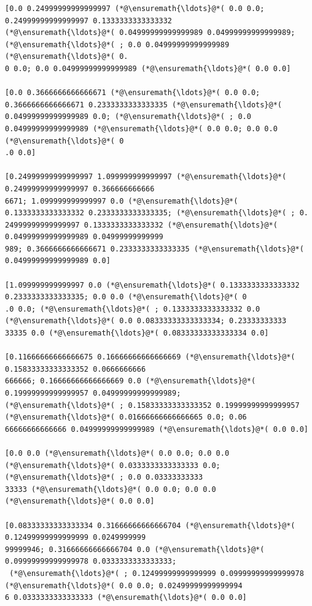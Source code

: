 \documentclass[12pt,a4paper]{article}
\begin{document}
\begin{lstlisting}
[0.0 0.24999999999999997 (*@\ensuremath{\ldots}@*( 0.0 0.0; 0.24999999999999997 0.1333333333333332 
(*@\ensuremath{\ldots}@*( 0.04999999999999989 0.04999999999999989; (*@\ensuremath{\ldots}@*( ; 0.0 0.04999999999999989 (*@\ensuremath{\ldots}@*( 0.
0 0.0; 0.0 0.04999999999999989 (*@\ensuremath{\ldots}@*( 0.0 0.0]

[0.0 0.3666666666666671 (*@\ensuremath{\ldots}@*( 0.0 0.0; 0.3666666666666671 0.2333333333333335 (*@\ensuremath{\ldots}@*( 
0.04999999999999989 0.0; (*@\ensuremath{\ldots}@*( ; 0.0 0.04999999999999989 (*@\ensuremath{\ldots}@*( 0.0 0.0; 0.0 0.0 (*@\ensuremath{\ldots}@*( 0
.0 0.0]

[0.24999999999999997 1.099999999999997 (*@\ensuremath{\ldots}@*( 0.24999999999999997 0.366666666666
6671; 1.099999999999997 0.0 (*@\ensuremath{\ldots}@*( 0.1333333333333332 0.2333333333333335; (*@\ensuremath{\ldots}@*( ; 0.
24999999999999997 0.1333333333333332 (*@\ensuremath{\ldots}@*( 0.04999999999999989 0.04999999999999
989; 0.3666666666666671 0.2333333333333335 (*@\ensuremath{\ldots}@*( 0.04999999999999989 0.0]

[1.099999999999997 0.0 (*@\ensuremath{\ldots}@*( 0.1333333333333332 0.2333333333333335; 0.0 0.0 (*@\ensuremath{\ldots}@*( 0
.0 0.0; (*@\ensuremath{\ldots}@*( ; 0.1333333333333332 0.0 (*@\ensuremath{\ldots}@*( 0.0 0.08333333333333334; 0.23333333333
33335 0.0 (*@\ensuremath{\ldots}@*( 0.08333333333333334 0.0]

[0.11666666666666675 0.16666666666666669 (*@\ensuremath{\ldots}@*( 0.15833333333333352 0.0666666666
666666; 0.16666666666666669 0.0 (*@\ensuremath{\ldots}@*( 0.19999999999999957 0.04999999999999989; 
(*@\ensuremath{\ldots}@*( ; 0.15833333333333352 0.19999999999999957 (*@\ensuremath{\ldots}@*( 0.01666666666666665 0.0; 0.06
66666666666666 0.04999999999999989 (*@\ensuremath{\ldots}@*( 0.0 0.0]

[0.0 0.0 (*@\ensuremath{\ldots}@*( 0.0 0.0; 0.0 0.0 (*@\ensuremath{\ldots}@*( 0.0333333333333333 0.0; (*@\ensuremath{\ldots}@*( ; 0.0 0.03333333333
33333 (*@\ensuremath{\ldots}@*( 0.0 0.0; 0.0 0.0 (*@\ensuremath{\ldots}@*( 0.0 0.0]

[0.08333333333333334 0.31666666666666704 (*@\ensuremath{\ldots}@*( 0.12499999999999999 0.0249999999
99999946; 0.31666666666666704 0.0 (*@\ensuremath{\ldots}@*( 0.09999999999999978 0.0333333333333333;
 (*@\ensuremath{\ldots}@*( ; 0.12499999999999999 0.09999999999999978 (*@\ensuremath{\ldots}@*( 0.0 0.0; 0.02499999999999994
6 0.0333333333333333 (*@\ensuremath{\ldots}@*( 0.0 0.0]


\end{lstlisting}
\end{document}
